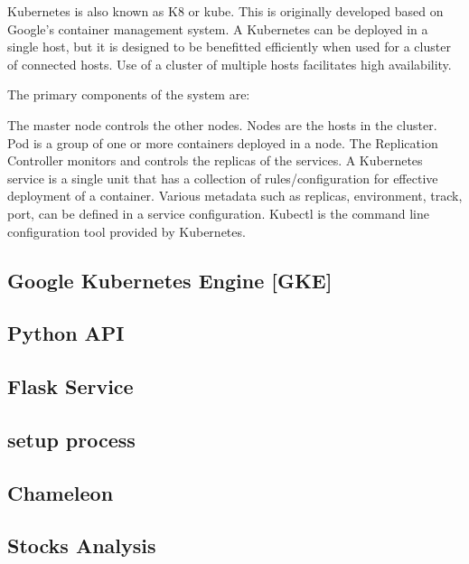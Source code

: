 Kubernetes is also known as K8 or kube. This is originally developed based on Google’s container 
management system. A Kubernetes can be deployed in a single host, but it is designed to be
benefitted efficiently when used for a cluster of connected hosts. Use of a cluster of 
multiple hosts facilitates high availability.


The primary components of the system are: 

The master node controls the other nodes. Nodes are the hosts in the cluster. Pod is a group 
of one or more containers deployed in a node.  The Replication Controller monitors and controls
the replicas of the services. A Kubernetes service is a single unit that has a collection of 
rules/configuration for effective deployment of a container. Various metadata such as replicas,
environment, track, port, can be defined in a service configuration. Kubectl is the command line 
configuration tool provided by Kubernetes. 


\subsection{Google Kubernetes Engine [GKE]}

\subsection{Python API}

\subsection{Flask Service}

\subsection{setup process}

\subsection{Chameleon}

\subsection{Stocks Analysis}

